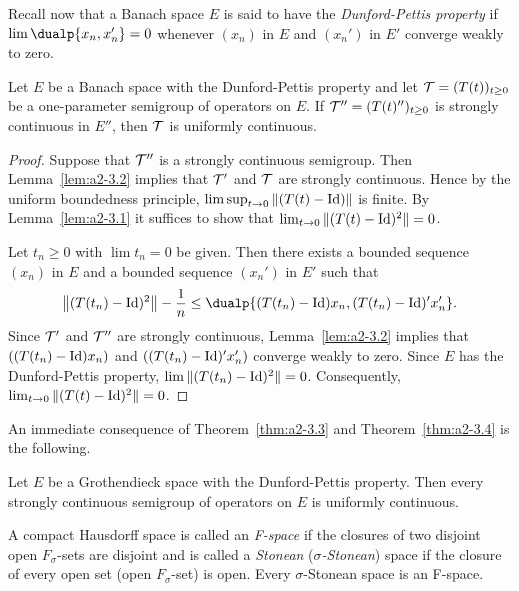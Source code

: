 Recall now that a Banach space $E$ is said to have the \emph{Dunford-Pettis property} if\/ $\lim \dualp{x_{n},x_{n}'} = 0$ whenever $(x_{n})$ in $E$ and $(x_{n}')$ in $E'$ converge weakly to zero.
\begin{theorem}\label{thm:a2-3.4}
Let $E$ be a Banach space with the Dunford-Pettis property and let  $\TT = (T(t))_{t \geq 0}$ be a one-parameter semigroup of operators on $E$.
If  $\TT'' = (T(t)'')_{t \geq 0}$ is strongly continuous in $E''$, then $\mathcal{T}$ is uniformly continuous.
\end{theorem}
\begin{proof}
Suppose that $\mathcal{T}''$ is a strongly continuous semigroup.
Then Lemma~\ref{lem:a2-3.2}   implies that $\mathcal{T}'$ and $\mathcal{T}$ are strongly continuous.
Hence by the uniform boundedness principle, $\lim \sup_{t \to 0} \|(T(t) - \operatorname{Id})\|$ is finite.
By Lemma~\ref{lem:a2-3.1}   it suffices to show that $\lim_{t \to 0} \|(T(t) - \operatorname{Id})^2\| = 0$.

Let $t_{n} \geq 0$ with $\lim t_{n} = 0$ be given.
Then there exists a bounded sequence $(x_{n})$ in $E$ and a bounded sequence $(x_{n}')$ in $E'$ such that
\[
\left\|(T(t_{n}) - \Id)^2 \right\| - \frac{1}{n} \leq \dualp{(T(t_{n}) - \Id)x_{n}, (T(t_{n}) - \Id)'x_{n}'} .
\]
Since $\mathcal{T}'$ and $\mathcal{T}''$ are strongly continuous, Lemma~\ref{lem:a2-3.2}   implies that $((T(t_{n}) - \operatorname{Id})x_{n})$ and $((T(t_{n}) - \operatorname{Id})'x_{n}')$ converge weakly to zero.
Since $E$ has the Dunford-Pettis property, $\lim \|(T(t_{n}) - \operatorname{Id})^2\| = 0$.
Consequently, $\lim_{t \to 0} \|(T(t) - \operatorname{Id})^2\| = 0$.
\end{proof}
An immediate consequence of Theorem~\ref{thm:a2-3.3}   and Theorem~\ref{thm:a2-3.4}   is the following.
\begin{theorem}\label{thm:a2-3.5}
Let $E$ be a Grothendieck space with the Dunford-Pettis property.
Then every strongly continuous semigroup of operators on $E$ is uniformly continuous.
\end{theorem}
A compact Hausdorff space is called an \emph{F-space} if the closures of two disjoint open $F_{\sigma}$-sets are disjoint and is called a \emph{Stonean} (\resp \emph{$\sigma$-Stonean}) space if the closure of every open set (\resp open $F_{\sigma}$-set) is open.
Every $\sigma$-Stonean space is an F-space.
